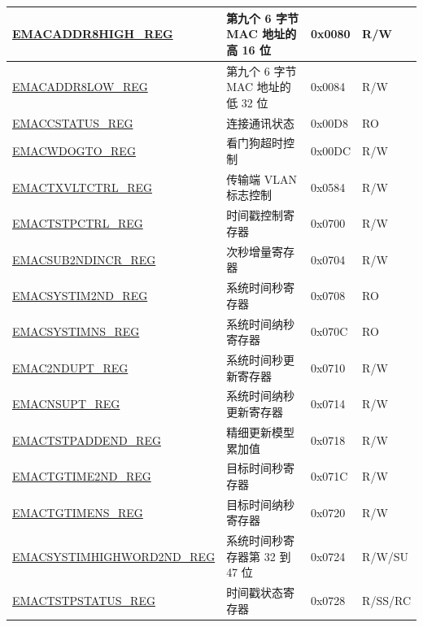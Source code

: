 \begin{longtable}{ |m{6cm} |m{5.3cm} | m{2cm} | m{2.2cm} | }
\hyperref[regdesc:EMACADDR8HIGHREG]{EMACADDR8HIGH\_REG} &  第九个 6 字节 MAC 地址的高 16 位 & 0x0080 & R/W \\ \hline
\hyperref[regdesc:EMACADDR8LOWREG]{EMACADDR8LOW\_REG} & 第九个 6 字节 MAC 地址的低 32 位 & 0x0084 & R/W \\ \hline

\hyperref[regdesc:EMACCSTATUSREG]{EMACCSTATUS\_REG} &  连接通讯状态& 0x00D8 & RO \\ \hline
\hyperref[regdesc:EMACWDOGTOREG]{EMACWDOGTO\_REG} & 看门狗超时控制& 0x00DC & R/W \\ \hline

\hyperref[regdesc:EMACTXVLANTAGCONTROLREG]{EMACTXVLTCTRL\_REG} & 传输端 VLAN 标志控制& 0x0584 & R/W \\ \hline

\hyperref[regdesc:EMACTIMESTAMPCONTROLREG]{EMACTSTPCTRL\_REG} & 时间戳控制寄存器& 0x0700 & R/W \\ \hline

\hyperref[regdesc:EMACSUBSECONDINCRREG]{EMACSUB2NDINCR\_REG} & 次秒增量寄存器& 0x0704 & R/W \\ \hline

\hyperref[regdesc:EMACSYSTEMTIMESREG]{EMACSYSTIM2ND\_REG} & 系统时间秒寄存器& 0x0708 & RO \\ \hline
\hyperref[regdesc:EMACSYSTEMTIMENANOSSREG]{EMACSYSTIMNS\_REG} & 系统时间纳秒寄存器& 0x070C & RO \\ \hline

\hyperref[regdesc:EMACSECONDSUPDATEREG]{EMAC2NDUPT\_REG} & 系统时间秒更新寄存器& 0x0710 & R/W \\ \hline

\hyperref[regdesc:EMACNANOSUPDATEREG]{EMACNSUPT\_REG} & 系统时间纳秒更新寄存器& 0x0714 & R/W \\ \hline
\hyperref[regdesc:EMACTIMESTAMPADDENDREG]{EMACTSTPADDEND\_REG} & 精细更新模型累加值& 0x0718 & R/W \\ \hline

\hyperref[regdesc:EMACTARGETTIMESECONDREG]{EMACTGTIME2ND\_REG} & 目标时间秒寄存器& 0x071C & R/W \\ \hline

\hyperref[regdesc:EMACTARGETTIMENANOSREG]{EMACTGTIMENS\_REG} & 目标时间纳秒寄存器& 0x0720 & R/W \\ \hline

\hyperref[regdesc:EMACSYSTEMTIMEHIGHERWORDSECONDREG]{EMACSYSTIMHIGHWORD2ND\_REG} & 系统时间秒寄存器第 32 到 47 位& 0x0724 & R/W/SU \\ \hline

\hyperref[regdesc:EMACTIMESTAMPSTATUSREG]{EMACTSTPSTATUS\_REG} & 时间戳状态寄存器& 0x0728 & R/SS/RC \\ \hline


\end{longtable}

